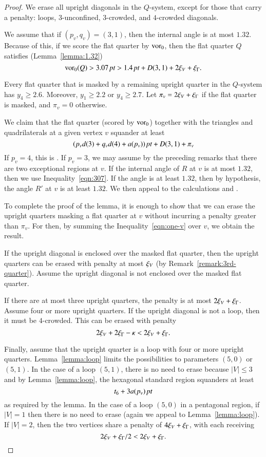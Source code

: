 \begin{proof}   We erase all upright diagonals in the
$Q$-system, except for those that carry a penalty: loops,
$3$-unconfined, $3$-crowded, and $4$-crowded diagonals.

We assume that if $(p_v,q_v)=(3,1)$, then the internal angle is at
most $1.32$. Because of this, if we score the flat quarter by
$\operatorname{vor}_0$, then the flat quarter $Q$ satisfies
(Lemma~\ref{lemma:1.32})
   \begin{equation}
   \operatorname{vor}_0(Q) > 3.07\,\hbox{\it pt} > 1.4\,\hbox{\it pt} + D(3,1) + 2\xi_V + \xi_\Gamma.
   \label{eqn:307}
   \end{equation}



Every flat quarter that is masked by a remaining upright quarter
in the $Q$-system has $y_4\ge2.6$.  Moreover, $y_1\ge2.2$ or
$y_4\ge2.7$.  Let $\pi_v = 2\xi_V + \xi_\Gamma$ if the flat quarter is
masked, and $\pi_v = 0$ otherwise.

We claim that the flat quarter (scored by $\operatorname{vor}_0$) together with
the triangles and quadrilaterals at a given vertex $v$ squander at
least
   \begin{equation}
   (p_v d(3) + q_v d(4) + a(p_v))\,\hbox{\it pt} + D(3,1) + \pi_v
   \label{eqn:one-v}
   \end{equation}
If $p_v=4$, this is .  If $p_v=3$, we may assume
by the preceding remarks that there are two exceptional regions at
$v$.  If the internal angle of $R$ at $v$ is at most $1.32$, then
we use Inequality~\ref{eqn:307}.  If the angle is at least $1.32$,
then by hypothesis, the angle $R'$ at $v$ is at least $1.32$.  We
then appeal to the calculations  and
.

To complete the proof of the lemma, it is enough to show that we
can erase the upright quarters masking a flat quarter at $v$
without incurring a penalty greater than $\pi_v$.  For then, by
summing the Inequality~\ref{eqn:one-v} over $v$, we obtain the
result.

If the upright diagonal is enclosed over the masked flat quarter,
then the upright quarters can be erased with penalty at most
$\xi_V$ (by Remark~\ref{remark:3rd-quarter}). Assume the upright
diagonal is not enclosed over the masked flat quarter.

If there are at most three upright quarters, the penalty is at
most $2\xi_V + \xi_\Gamma$.  Assume four or more upright quarters.  If
the upright diagonal is not a loop, then it must be $4$-crowded.
This can be erased with penalty
   $$2\xi_V + 2\xi_\Gamma - \kappa < 2\xi_V + \xi_\Gamma.$$

Finally, assume that the upright quarter is a loop with four or
more upright quarters.  Lemma~\ref{lemma:loop} limits the
possibilities to parameters $(5,0)$ or $(5,1)$.  In the case of a
loop $(5,1)$, there is no need to erase because $|V|\le3$ and by
Lemma~\ref{lemma:loop}, the hexagonal standard region squanders at
least
   $$t_6 + 3 a(p_v)\,\hbox{\it pt}$$
as required by the lemma.  In the case of a loop $(5,0)$ in a
pentagonal region, if $|V|=1$ then there is no need to erase
(again we appeal to Lemma~\ref{lemma:loop}).  If $|V| =2$, then
the two vertices share a penalty of $4\xi_V + \xi_\Gamma$, with each
receiving
   $$2\xi_V + \xi_\Gamma/2 < 2\xi_V +\xi_\Gamma.$$
\end{proof}

